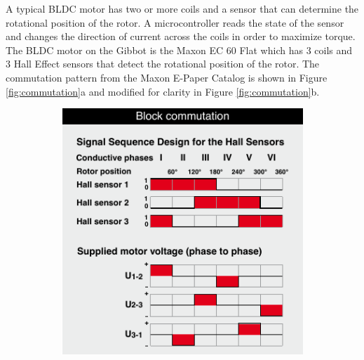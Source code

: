 \documentclass{article}
\begin{document}
A typical BLDC motor has two or more coils and a sensor that can determine the rotational position of the rotor. A microcontroller reads the state of the sensor and changes the direction of current across the coils in order to maximize torque. The BLDC motor on the Gibbot is the Maxon EC 60 Flat which has 3 coils and 3 Hall Effect sensors that detect the rotational position of the rotor. The commutation pattern from the Maxon E-Paper Catalog is shown in Figure \ref{fig:commutation}a and modified for clarity in Figure \ref{fig:commutation}b. 
\begin{figure}[h]
	\centering
	\begin{subfigure}{0.4\textwidth}
		\includegraphics[width=\textwidth]{commutation}
		\caption{}
	\end{subfigure}
	\quad
	\begin{subfigure}{0.4\textwidth}

\end{subfigure}
\end{figure}
\end{document}
